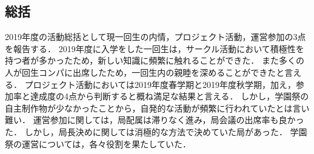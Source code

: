 \subsection*{\firstGrade{}総括}




2019年度の活動総括として現一回生の内情，プロジェクト活動，運営参加の3点を報告する．
2019年度に入学をした一回生は，サークル活動において積極性を持つ者が多かったため，新しい知識に頻繁に触れることができた．
また多くの人が回生コンパに出席したため，一回生内の親睦を深めることができたと言える．
プロジェクト活動においては2019年度春学期と2019年度秋学期，加え，参加率と達成度の4点から判断すると概ね満足な結果と言える．
しかし，学園祭の自主制作物が少なかったことから，自発的な活動が頻繁に行われていたとは言い難い．
運営参加に関しては，局配属は滞りなく進み，局会議の出席率も良かった．
しかし，局長決めに関しては消極的な方法で決めていた局があった．
学園祭の運営については，各々役割を果たしていた．

